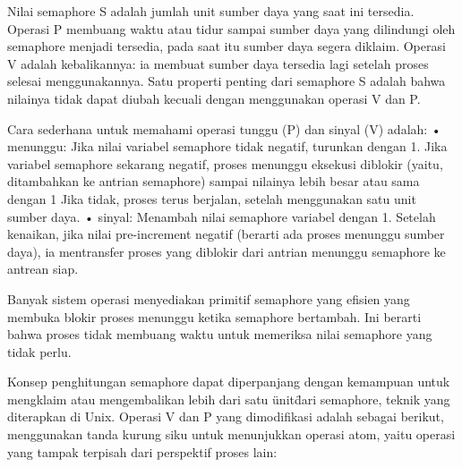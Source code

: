 Nilai semaphore S adalah jumlah unit sumber daya yang saat ini tersedia. Operasi P membuang waktu atau tidur sampai sumber daya yang dilindungi oleh semaphore 
menjadi tersedia, pada saat itu sumber daya segera diklaim. Operasi V adalah kebalikannya: ia membuat sumber daya tersedia lagi setelah proses selesai 
menggunakannya. Satu properti penting dari semaphore S adalah bahwa nilainya tidak dapat diubah kecuali dengan menggunakan operasi V dan P.

Cara sederhana untuk memahami operasi tunggu (P) dan sinyal (V) adalah:
• menunggu: Jika nilai variabel semaphore tidak negatif, turunkan dengan 1. Jika variabel semaphore sekarang negatif, proses menunggu eksekusi diblokir 
(yaitu, ditambahkan ke antrian semaphore) sampai nilainya lebih besar atau sama dengan 1 Jika tidak, proses terus berjalan, setelah menggunakan satu unit 
sumber daya.
• sinyal: Menambah nilai semaphore variabel dengan 1. Setelah kenaikan, jika nilai pre-increment negatif (berarti ada proses menunggu sumber daya), ia 
mentransfer proses yang diblokir dari antrian menunggu semaphore ke antrean siap.

Banyak sistem operasi menyediakan primitif semaphore yang efisien yang membuka blokir proses menunggu ketika semaphore bertambah. Ini berarti bahwa proses 
tidak membuang waktu untuk memeriksa nilai semaphore yang tidak perlu.

Konsep penghitungan semaphore dapat diperpanjang dengan kemampuan untuk mengklaim atau mengembalikan lebih dari satu \"unit\" dari semaphore, teknik yang 
diterapkan di Unix. Operasi V dan P yang dimodifikasi adalah sebagai berikut, menggunakan tanda kurung siku untuk menunjukkan operasi atom, yaitu operasi 
yang tampak terpisah dari perspektif proses lain: